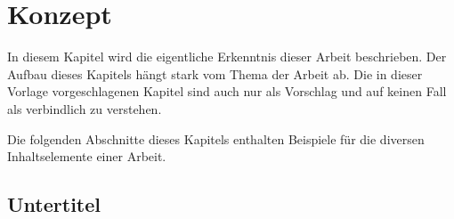 
\chapter{Konzept}
\label{chapter-konzept}

In diesem Kapitel wird die eigentliche Erkenntnis dieser Arbeit beschrieben. Der Aufbau dieses
Kapitels hängt stark vom Thema der Arbeit ab. Die in dieser Vorlage vorgeschlagenen Kapitel sind
auch nur als Vorschlag und auf keinen Fall als verbindlich zu verstehen.

Die folgenden Abschnitte dieses Kapitels enthalten Beispiele für die diversen Inhaltselemente einer
Arbeit.



\section{Untertitel} 

